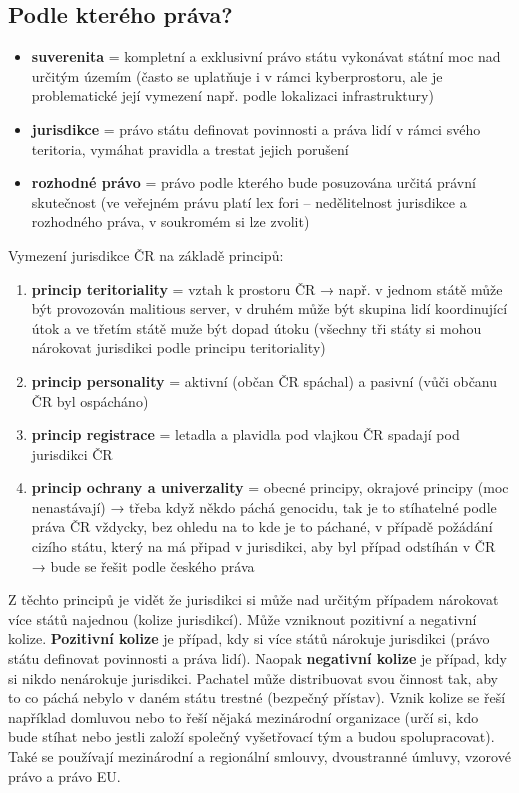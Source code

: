 \subsection{Podle kterého práva?}
\begin{itemize}
    \item \textbf{suverenita} = kompletní a exklusivní právo státu vykonávat státní moc nad určitým územím (často se uplatňuje i v rámci kyberprostoru, ale je problematické její vymezení např. podle lokalizaci infrastruktury)
    \item \textbf{jurisdikce} = právo státu definovat povinnosti a práva lidí v rámci svého teritoria, vymáhat pravidla a trestat jejich porušení
    \item \textbf{rozhodné právo} = právo podle kterého bude posuzována určitá právní skutečnost (ve veřejném právu platí lex fori -- nedělitelnost jurisdikce a rozhodného práva, v soukromém si lze zvolit)
\end{itemize}

Vymezení jurisdikce ČR na základě principů: 
\begin{enumerate}
    \item \textbf{princip teritoriality} = vztah k prostoru ČR → např. v jednom státě může být provozován malitious server, v druhém může být skupina lidí koordinující útok a ve třetím státě muže být dopad útoku (všechny tři státy si mohou nárokovat jurisdikci podle principu teritoriality)
    \item \textbf{princip personality} = aktivní (občan ČR spáchal) a pasivní (vůči občanu ČR byl ospácháno)
    \item \textbf{princip registrace} = letadla a plavidla pod vlajkou ČR spadají pod jurisdikci ČR
    \item \textbf{princip ochrany a univerzality} = obecné principy, okrajové principy (moc nenastávají) → třeba když někdo páchá genocidu, tak je to stíhatelné podle práva ČR vždycky, bez ohledu na to kde je to páchané, v případě požádání cizího státu, který na má připad v jurisdikci, aby byl případ odstíhán v ČR → bude se řešit podle českého práva
\end{enumerate}

Z těchto principů je vidět že jurisdikci si může nad určitým případem nárokovat více států najednou (kolize jurisdikcí). Může vzniknout pozitivní a negativní kolize. \textbf{Pozitivní kolize} je případ, kdy si více států nárokuje jurisdikci (právo státu definovat povinnosti a práva lidí). Naopak \textbf{negativní kolize} je případ, kdy si nikdo nenárokuje jurisdikci. Pachatel může distribuovat svou činnost tak, aby to co páchá nebylo v daném státu trestné (bezpečný přístav). Vznik kolize se řeší například domluvou nebo to řeší nějaká mezinárodní organizace (určí si, kdo bude stíhat nebo jestli založí společný vyšetřovací tým a budou spolupracovat). Také se používají mezinárodní a regionální smlouvy, dvoustranné úmluvy, vzorové právo a právo EU.

